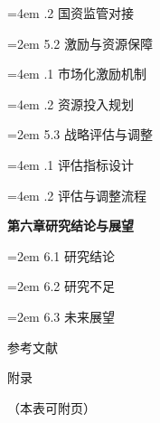 \documentclass[UTF8, a4paper, 11pt]{ctexart}
\begin{document}
\begin{UnifiedBox}
\hangindent=4em 
.2 国资监管对接

\hangindent=2em 
5.2 激励与资源保障

\hangindent=4em 
.1 市场化激励机制

\hangindent=4em 
.2 资源投入规划

\hangindent=2em 
5.3 战略评估与调整

\hangindent=4em 
.1 评估指标设计

\hangindent=4em 
.2 评估与调整流程

\vspace{0.3cm}
\noindent \textbf{第六章\quad 研究结论与展望}

\hangindent=2em 
6.1 研究结论

\hangindent=2em 
6.2 研究不足

\hangindent=2em 
6.3 未来展望

\noindent 参考文献

\noindent 附录

\vfill
\begin{flushright} （本表可附页） \end{flushright}
\end{UnifiedBox}

\vspace{0.6cm}

\newpage
\end{document}
